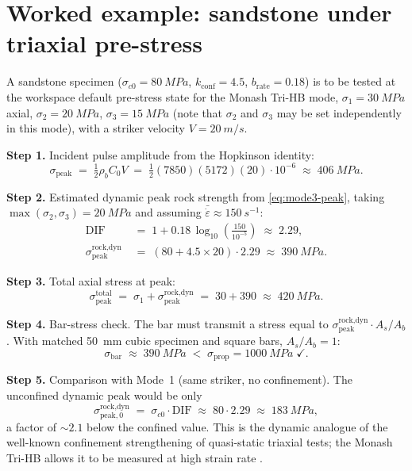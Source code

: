 \documentclass[11pt,a4paper,openany]{book}
\providecommand{\SI}[2]{\qty{#1}{#2}}
\theoremstyle{handbook}
\newcommand{\sig}{\sigma}
\newcommand{\eps}{\varepsilon}
\newcommand{\epsdot}{\dot\eps}
\newcommand{\Cz}{C_0}
\newcommand{\Ab}{A_b}
\newcommand{\As}{A_s}
\newcommand{\sigprop}{\sig_{\text{prop}}}
\newcommand{\sigpeak}{\sig_{\text{peak}}}
\begin{document}
\section{Worked example: sandstone under triaxial pre-stress}

A sandstone specimen ($\sig_{c0}=\SI{80}{MPa}$, $k_{\text{conf}}=4.5$,
$b_{\text{rate}}=0.18$) is to be tested at the workspace default
pre-stress state for the Monash Tri-HB mode, $\sig_1=\SI{30}{MPa}$ axial,
$\sig_2=\SI{20}{MPa}$, $\sig_3=\SI{15}{MPa}$ (note that $\sig_2$ and
$\sig_3$ may be set independently in this mode), with a striker velocity
$V=\SI{20}{m/s}$.

\textbf{Step 1.} Incident pulse amplitude from the Hopkinson identity:
\[
  \sigpeak \;=\; \tfrac{1}{2}\rho_b\Cz V
              \;=\; \tfrac{1}{2}(7850)(5172)(20) \cdot 10^{-6}
              \;\approx\; \SI{406}{MPa}.
\]

\textbf{Step 2.} Estimated dynamic peak rock strength from
\eqref{eq:mode3-peak}, taking $\max(\sig_2,\sig_3)=\SI{20}{MPa}$ and
assuming $\bar\epsdot\approx\SI{150}{s^{-1}}$:
\begin{align*}
  \text{DIF} &\;=\; 1 + 0.18\,\log_{10}\!\left(\frac{150}{10^{-5}}\right)
                \;\approx\; 2.29, \\
  \sig_{\text{peak}}^{\text{rock,dyn}}
    &\;=\; (80 + 4.5\times 20)\cdot 2.29
    \;\approx\; \SI{390}{MPa}.
\end{align*}

\textbf{Step 3.} Total axial stress at peak:
\[
  \sigpeak^{\text{total}} \;=\; \sig_1 + \sig_{\text{peak}}^{\text{rock,dyn}}
                          \;=\; 30 + 390 \;\approx\; \SI{420}{MPa}.
\]

\textbf{Step 4.} Bar-stress check. The bar must transmit a stress equal to
$\sig_{\text{peak}}^{\text{rock,dyn}}\cdot \As/\Ab$. With matched
\SI{50}{mm} cubic specimen and square bars, $\As/\Ab=1$:
\[
  \sig_{\text{bar}} \;\approx\; \SI{390}{MPa}
                    \;<\; \sigprop=\SI{1000}{MPa}\;\checkmark.
\]

\textbf{Step 5.} Comparison with Mode~1 (same striker, no confinement).
The unconfined dynamic peak would be only
\[
  \sig_{\text{peak},0}^{\text{rock,dyn}}
    \;=\; \sig_{c0}\cdot\text{DIF}
    \;\approx\; 80\cdot 2.29 \;\approx\; \SI{183}{MPa},
\]
a factor of $\sim 2.1$ below the confined value. This is the dynamic
analogue of the well-known confinement strengthening of quasi-static
triaxial tests; the Monash Tri-HB allows it to be measured at high strain
rate \cite{Liu2019}.
\end{document}
